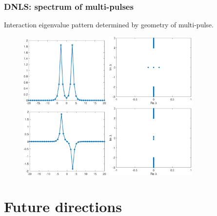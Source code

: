 \documentclass[16pt]{beamer}
\begin{document}
\begin{frame}
\frametitle{DNLS: spectrum of multi-pulses}
\fontsize{16}{7.2}\selectfont
Interaction eigenvalue pattern determined by geometry of multi-pulse.
\begin{figure}[H]
\centering
\includegraphics[width=4.5cm]{images/dnlsPP.eps}
\includegraphics[width=4.5cm]{images/dnlsPPeig.eps}
\includegraphics[width=4.5cm]{images/dnlsPM.eps}
\includegraphics[width=4.5cm]{images/dnlsPMeig.eps}
\end{figure}
\end{frame}

\section{Future directions}
\end{document}
